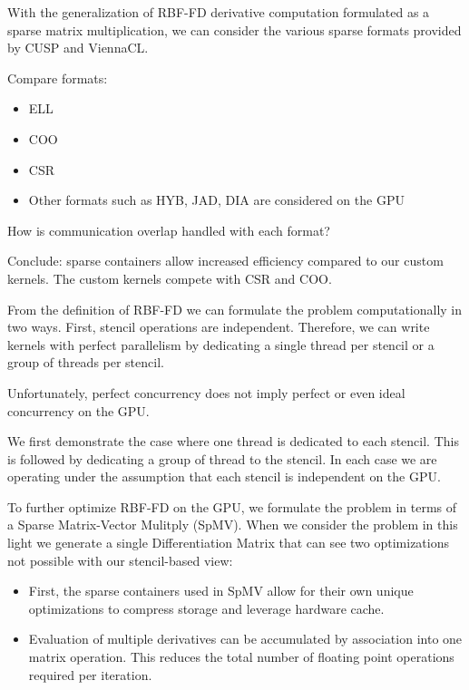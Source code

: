 \documentclass{report}
\begin{document}
With the generalization of RBF-FD derivative computation formulated as a sparse matrix multiplication, we can 
consider the various sparse formats provided by CUSP and ViennaCL. 


Compare formats: 
\begin{itemize}
\item ELL
\item COO
\item CSR
\item Other formats such as HYB, JAD, DIA are considered on the GPU
\end{itemize}

How is communication overlap handled with each format? 


Conclude: sparse containers allow increased efficiency compared to our custom kernels. The custom kernels compete with CSR and COO. 


From the definition of RBF-FD we can formulate the problem computationally in two ways. First, stencil operations are independent. Therefore, we can write kernels with perfect parallelism by dedicating a single thread per stencil or a group of threads per stencil.  

Unfortunately, perfect concurrency does not imply perfect or even ideal concurrency on the GPU. 

We first demonstrate the case where one thread is dedicated to each stencil. This is followed by dedicating a group of thread to the stencil. In each case we are operating under the assumption that each stencil is independent on the GPU. 

To further optimize RBF-FD on the GPU, we formulate the problem in terms of a Sparse Matrix-Vector Mulitply (SpMV). When we consider the problem in this light we generate a single Differentiation Matrix that can see two optimizations not possible with our stencil-based view: 
\begin{itemize} 
\item First, the sparse containers used in SpMV allow for their own unique optimizations to compress storage and leverage hardware cache.
\item Evaluation of multiple derivatives can be accumulated by association into one matrix operation. This reduces the total number of floating point operations required per iteration. 
\end{itemize}
\end{document}
